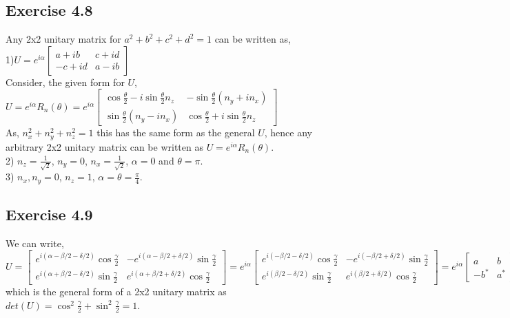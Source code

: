 \documentclass[a4paper,12pt]{article}
\begin{document}
\subsection*{Exercise 4.8}
Any 2x2 unitary matrix for $a^2+b^2+c^2+d^2=1$ can be written as,\\
1)$U=e^{i\alpha}\begin{bmatrix}
    a+ib&c+id\\
    -c+id& a-ib
\end{bmatrix}$\\
Consider, the given form for $U$,\\
$U=e^{i\alpha}R_n(\theta)=e^{i\alpha}\begin{bmatrix}
    \cos\frac{\theta}{2}-i\sin\frac{\theta}{2}n_z & -\sin\frac{\theta}{2}(n_y+in_x)\\
    \sin\frac{\theta}{2}(n_y-in_x)& \cos\frac{\theta}{2}+i\sin\frac{\theta}{2}n_z
\end{bmatrix}$\\
As, $n_x^2+n_y^2+n_z^2=1$ this has the same form as the general $U$, hence any 
arbitrary 2x2 unitary matrix can be written as $U=e^{i\alpha}R_n(\theta)$.\\
2) $n_z=\frac{1}{\sqrt{2}}$, $n_y=0$, $n_x=\frac{1}{\sqrt{2}}$,
$\alpha=0$ and $\theta=\pi$.\\
3) $n_x,n_y=0$, $n_z=1$, $\alpha =\theta=\frac{\pi}{4}$.
\subsection*{Exercise 4.9}
We can write,\\
$U=\begin{bmatrix}
    e^{i(\alpha-\beta/2-\delta/2)}\cos\frac{\gamma}{2} & -e^{i(\alpha-\beta/2+\delta/2)}\sin\frac{\gamma}{2}\\
    e^{i(\alpha+\beta/2-\delta/2)}\sin\frac{\gamma}{2} & e^{i(\alpha+\beta/2+\delta/2)}\cos\frac{\gamma}{2}
\end{bmatrix}=e^{i\alpha}
\begin{bmatrix}
    e^{i(-\beta/2-\delta/2)}\cos\frac{\gamma}{2} & -e^{i(-\beta/2+\delta/2)}\sin\frac{\gamma}{2}\\
    e^{i(\beta/2-\delta/2)}\sin\frac{\gamma}{2} & e^{i(\beta/2+\delta/2)}\cos\frac{\gamma}{2}
\end{bmatrix}=e^{i\alpha}
\begin{bmatrix}
    a & b\\
    -b^* & a^*
\end{bmatrix}$\\
which is the general form of a 2x2 unitary matrix as $det(U)=\cos^2\frac{\gamma}{2}+
\sin^2\frac{\gamma}{2}=1$.
\end{document}
